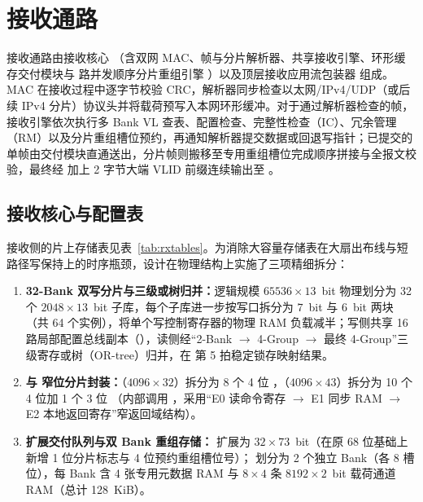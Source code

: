 \chapter{接收通路}\label{ch:rx}

接收通路由接收核心 （含双网 MAC、帧与分片解析器、共享接收引擎、环形缓存交付模块与 \ReasmContexts{} 路并发顺序分片重组引擎 ）以及顶层接收应用流包装器  组成。MAC 在接收过程中逐字节校验 CRC，解析器同步检查以太网/IPv4/UDP（或后续 IPv4 分片）协议头并将载荷预写入本网环形缓冲。对于通过解析器检查的帧，接收引擎依次执行多 Bank VL 查表、配置检查、完整性检查（IC）、冗余管理（RM）以及分片重组槽位预约，再通知解析器提交数据或回退写指针；已提交的单帧由交付模块直通送出，分片帧则搬移至专用重组槽位完成顺序拼接与全报文校验，最终经  加上 2 字节大端 VLID 前缀连续输出至 。

\section{接收核心与配置表}\label{sec:rxtables}


接收侧的片上存储表见表~\ref{tab:rxtables}。为消除大容量存储表在大扇出布线与短路径写保持上的时序瓶颈，设计在物理结构上实施了三项精细拆分：
\begin{enumerate}[leftmargin=2em,itemsep=1pt]
  \item \textbf{ 32-Bank 双写分片与三级或树归并：}逻辑规模 $65536\times 13$~bit 物理划分为 32 个 $2048\times 13$~bit 子库，每个子库进一步按写口拆分为 $7$~bit 与 $6$~bit 两块 （共 64 个实例），将单个写控制寄存器的物理 RAM 负载减半；写侧共享 16 路局部配置总线副本（），读侧经“2-Bank $\rightarrow$ 4-Group $\rightarrow$ 最终 4-Group”三级寄存或树（OR-tree）归并，在  第 5 拍稳定锁存映射结果。
  \item \textbf{ 与  窄位分片封装：}（$4096\times 32$）拆分为 8 个 4 位 ，（$4096\times 43$）拆分为 10 个 4 位加 1 个 3 位 （内部调用 ，采用“E0 读命令寄存 $\rightarrow$ E1 同步 RAM $\rightarrow$ E2 本地返回寄存”窄返回域结构）。
  \item \textbf{扩展交付队列与双 Bank 重组存储：} 扩展为 $32\times 73$~bit（在原 68 位基础上新增 1 位分片标志与 4 位预约重组槽位号）； 划分为 2 个独立 Bank（各 8 槽位），每 Bank 含 4 张专用元数据 RAM 与 $8\times 4$ 条 $8192\times 2$~bit 载荷通道 RAM（总计 128~KiB）。
\end{enumerate}

